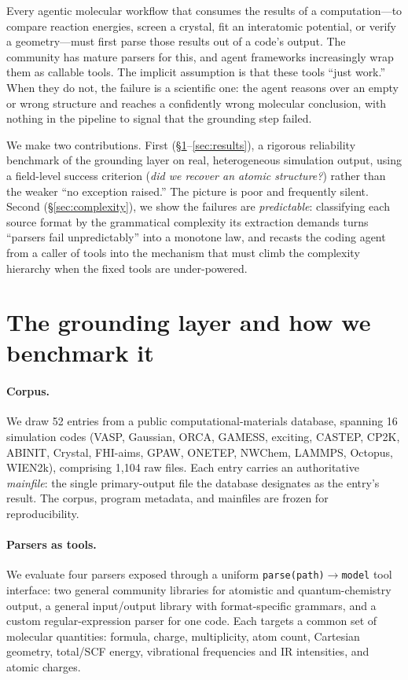 \documentclass{article}
\begin{document}
Every agentic molecular workflow that consumes the results of a computation---to
compare reaction energies, screen a crystal, fit an interatomic potential, or
verify a geometry---must first parse those results out of a code's output. The
community has mature parsers for this, and agent frameworks increasingly wrap them
as callable tools. The implicit assumption is that these tools ``just work.'' When
they do not, the failure is a scientific one: the agent reasons over an empty or
wrong structure and reaches a confidently wrong molecular conclusion, with nothing
in the pipeline to signal that the grounding step failed.

We make two contributions. First (\S\ref{sec:bench}--\ref{sec:results}), a
rigorous reliability benchmark of the grounding layer on real, heterogeneous
simulation output, using a field-level success criterion (\emph{did we recover an
atomic structure?}) rather than the weaker ``no exception raised.'' The picture is
poor and frequently silent. Second (\S\ref{sec:complexity}), we show the failures
are \emph{predictable}: classifying each source format by the grammatical
complexity its extraction demands turns ``parsers fail unpredictably'' into a
monotone law, and recasts the coding agent from a caller of tools into the
mechanism that must climb the complexity hierarchy when the fixed tools are
under-powered.

\section{The grounding layer and how we benchmark it}
\label{sec:bench}

\paragraph{Corpus.} We draw 52 entries from a public computational-materials
database, spanning 16 simulation codes (VASP, Gaussian, ORCA, GAMESS, exciting,
CASTEP, CP2K, ABINIT, Crystal, FHI-aims, GPAW, ONETEP, NWChem, LAMMPS, Octopus,
WIEN2k), comprising 1{,}104 raw files. Each entry carries an authoritative
\emph{mainfile}: the single primary-output file the database designates as the
entry's result. The corpus, program metadata, and mainfiles are frozen for
reproducibility.

\paragraph{Parsers as tools.} We evaluate four parsers exposed through a uniform
\texttt{parse(path)$\rightarrow$model} tool interface: two general community
libraries for atomistic and quantum-chemistry output, a general
input/output library with format-specific grammars, and a custom regular-expression
parser for one code. Each targets a common set of molecular quantities: formula,
charge, multiplicity, atom count, Cartesian geometry, total/SCF energy,
vibrational frequencies and IR intensities, and atomic charges.
\end{document}
